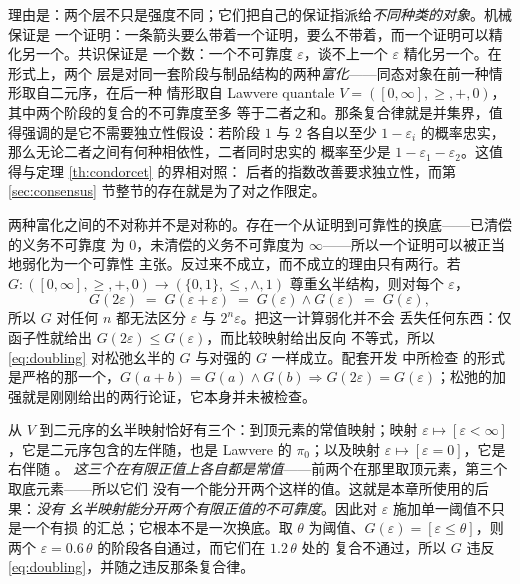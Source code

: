 理由是：两个层不只是强度不同；它们把自己的保证指派给\emph{不同种类的对象}。机械保证是
一个证明：一条箭头要么带着一个证明，要么不带着，而一个证明可以精化另一个。共识保证是
一个数：一个不可靠度 $\varepsilon$，谈不上一个 $\varepsilon$ 精化另一个。在形式上，两个
层是对同一套阶段与制品结构的两种\emph{富化}——同态对象在前一种情形取自二元序，在后一种
情形取自 Lawvere quantale $V = ([0,\infty],\geq,+,0)$，其中两个阶段的复合的不可靠度至多
等于二者之和。那条复合律就是并集界，值得强调的是它不需要独立性假设：若阶段 $1$ 与 $2$
各自以至少 $1-\varepsilon_i$ 的概率忠实，那么无论二者之间有何种相依性，二者同时忠实的
概率至少是 $1-\varepsilon_1-\varepsilon_2$。这值得与定理 \ref{th:condorcet} 的界相对照：
后者的指数改善要求独立性，而第 \ref{sec:consensus} 节整节的存在就是为了对之作限定。

两种富化之间的不对称并不是对称的。存在一个从证明到可靠性的换底——已清偿的义务不可靠度
为 $0$，未清偿的义务不可靠度为 $\infty$——所以一个证明可以被正当地弱化为一个可靠性
主张。反过来不成立，而不成立的理由只有两行。若
$G : ([0,\infty],\geq,+,0) \to (\{0,1\},\leq,\wedge,1)$ 尊重幺半结构，则对每个
$\varepsilon$，
\begin{equation}\label{eq:doubling}
G(2\varepsilon) \;=\; G(\varepsilon+\varepsilon) \;=\; G(\varepsilon)\wedge G(\varepsilon)
\;=\; G(\varepsilon),
\end{equation}
所以 $G$ 对任何 $n$ 都无法区分 $\varepsilon$ 与 $2^n\varepsilon$。把这一计算弱化并不会
丢失任何东西：仅函子性就给出 $G(2\varepsilon) \leq G(\varepsilon)$，而比较映射给出反向
不等式，所以 \eqref{eq:doubling} 对松弛幺半的 $G$ 与对强的 $G$ 一样成立。配套开发 \cite{assaylean} 中所检查
的形式是严格的那一个，$G(a+b) = G(a)\wedge G(b) \Rightarrow G(2\varepsilon) =
G(\varepsilon)$；松弛的加强就是刚刚给出的两行论证，它本身并未被检查。

从 $V$ 到二元序的幺半映射恰好有三个：到顶元素的常值映射；映射
$\varepsilon \mapsto [\varepsilon < \infty]$，它是二元序包含的左伴随，也是 Lawvere 的
$\pi_0$；以及映射 $\varepsilon \mapsto [\varepsilon = 0]$，它是右伴随 \cite{lawvere1973}。
\emph{这三个在有限正值上各自都是常值}——前两个在那里取顶元素，第三个取底元素——所以它们
没有一个能分开两个这样的值。这就是本章所使用的后果：\emph{没有
幺半映射能分开两个有限正值的不可靠度}。因此对 $\varepsilon$ 施加单一阈值不只是一个有损
的汇总；它根本不是一次换底。取 $\theta$ 为阈值、$G(\varepsilon) = [\varepsilon \leq
\theta]$，则两个 $\varepsilon = 0.6\,\theta$ 的阶段各自通过，而它们在 $1.2\,\theta$ 处的
复合不通过，所以 $G$ 违反 \eqref{eq:doubling}，并随之违反那条复合律。

